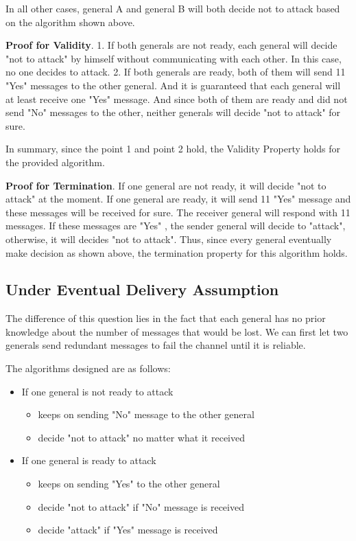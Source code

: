 \documentclass[11pt,a4paper]{article}
\begin{document}
In all other cases, general A and general B will both decide not to attack
based on the algorithm shown above.

\textbf{Proof for Validity}. 
1. If both generals are not ready, each general will decide "not to attack"
by himself without communicating with each other. In this case, no one decides
to attack.
2. If both generals are ready, both of them will send 11 "Yes" messages to the other
general. And it is guaranteed that each general will at least receive one
"Yes" message. And since both of them are ready and did not send "No" messages
to the other, neither generals will decide "not to attack" for sure. 

In summary, since the point 1 and point 2 hold, the Validity Property
holds for the provided algorithm.

\textbf{Proof for Termination}. 
If one general are not ready, it will decide "not to attack" at the moment. 
If one general are ready, it will send 11 "Yes" message and these messages
will be received for sure. The receiver general will respond with 11 messages.
If these messages are "Yes" , the sender general will decide to "attack",
otherwise, it will decides "not to attack".  Thus, since every general
eventually make decision as shown above, the termination property for this
algorithm holds. 

\newpage
\subsection{Under Eventual Delivery Assumption}
The difference of this question lies in the fact that each general has no
prior knowledge about the number of messages that would be lost. We can
first let two generals send redundant messages to fail the channel until it is
reliable. 

The algorithms designed are as follows:
\begin{itemize}
    \item{If one general is not ready to attack}
        \begin{itemize}
        \item{keeps on sending "No" message to the other general}
        \item{decide "not to attack" no matter what it received}
        \end{itemize}
    \item{If one general is ready to attack}
        \begin{itemize}
        \item{keeps on sending "Yes" to the other general}
        \item{decide "not to attack" if "No" message is received}
        \item{decide "attack" if "Yes" message is received}
        \end{itemize}
\end{itemize}
\end{document}
